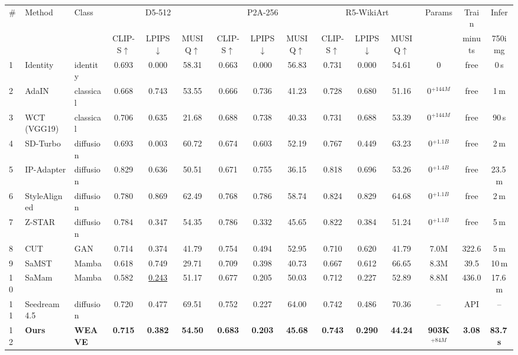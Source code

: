 \documentclass[letterpaper]{article}
\begin{document}
\begin{table}[t!]
\centering
\small
\renewcommand{\arraystretch}{0.9}
\setlength{\tabcolsep}{0.8pt}
\begin{tabular}{@{}lllcccccccccccc@{}}
\toprule
\# & Method & Class & \multicolumn{3}{c}{D5-512} & \multicolumn{3}{c}{P2A-256} & \multicolumn{3}{c}{R5-WikiArt} & Params & Train & Infer \\
\cmidrule(lr){4-6} \cmidrule(lr){7-9} \cmidrule(lr){10-12} \cmidrule(lr){14-14} \cmidrule(lr){15-15}
& & & CLIP-S$\uparrow$ & LPIPS$\downarrow$ & MUSIQ$\uparrow$ & CLIP-S$\uparrow$ & LPIPS$\downarrow$ & MUSIQ$\uparrow$ & CLIP-S$\uparrow$ & LPIPS$\downarrow$ & MUSIQ$\uparrow$ & & minuts & 750img \\
\midrule
1 & Identity & identity & 0.693 & 0.000 & 58.31 & 0.663 & 0.000 & 56.83 & 0.731 & 0.000 & 54.61 & 0 & free & 0\,s \\
2 & AdaIN & classical & 0.668 & 0.743 & 53.55 & 0.666 & 0.736 & 41.23 & 0.728 & 0.680 & 51.16 & 0$^{+144M}$ & free & 1\,m \\
3 & WCT (VGG19) & classical & 0.706 & 0.635 & 21.68 & 0.688 & 0.738 & 40.33 & 0.731 & 0.688 & 53.39 & 0$^{+144M}$ & free & 90\,s \\
4 & SD-Turbo & diffusion & 0.693 & 0.003 & 60.72 & 0.674 & 0.603 & 52.19 & 0.767 & 0.449 & 63.23 & 0$^{+1.1B}$ & free & 2\,m \\
5 & IP-Adapter & diffusion & 0.829 & 0.636 & 50.51 & 0.671 & 0.755 & 36.15 & 0.818 & 0.696 & 53.26 & 0$^{+1.4B}$ & free & 23.5\,m \\
6 & StyleAligned & diffusion & 0.780 & 0.869 & 62.49 & 0.768 & 0.786 & 58.74 & 0.824 & 0.829 & 64.68 & 0$^{+1.1B}$ & free & 2\,m \\
7 & Z-STAR & diffusion & 0.784 & 0.347 & 54.35 & 0.786 & 0.332 & 45.65 & 0.822 & 0.384 & 51.24 & 0$^{+1.1B}$ & free & 5\,m \\
8 & CUT & GAN & 0.714 & 0.374 & 41.79 & 0.754 & 0.494 & 52.95 & 0.710 & 0.620 & 41.79 & 7.0M & 322.6 & 5\,m \\
9 & SaMST & Mamba & 0.618 & 0.749 & 29.71 & 0.709 & 0.398 & 40.73 & 0.667 & 0.612 & 66.65 & 8.3M & 39.5 & 10\,m \\
10 & SaMam & Mamba & 0.582 & \underline{0.243} & 51.17 & 0.677 & 0.205 & 50.03 & 0.712 & 0.227 & 52.89 & 8.8M & 436.0 & 17.6\,m \\
11 & Seedream 4.5 & diffusion & 0.720 & 0.477 & 69.51 & 0.752 & 0.227 & 64.00 & 0.742 & 0.486 & 70.36 & -- & API & -- \\
\midrule
12 & \textbf{Ours} & \textbf{WEAVE} & \textbf{0.715} & \textbf{0.382} & \textbf{54.50} & \textbf{0.683} & \textbf{0.203} & \textbf{45.68} & \textbf{0.743} & \textbf{0.290} & \textbf{44.24} & \textbf{903K$^{+84M}$} & \textbf{3.08} & \textbf{83.7\,s} \\

\end{tabular}
\end{table}
\end{document}

